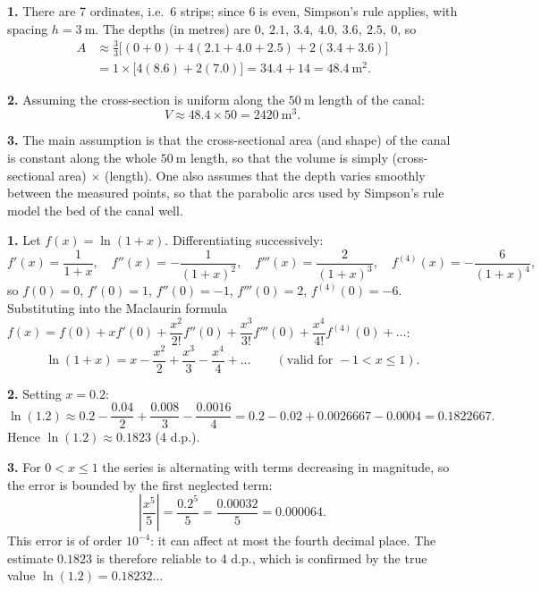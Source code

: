 \documentclass[11pt]{article}
\begin{document}
\begin{corrige}
\textbf{1.} There are 7 ordinates, i.e.\ 6 strips; since 6 is even, Simpson's rule applies, with spacing $h = 3\ \mathrm{m}$. The depths (in metres) are $0,\ 2.1,\ 3.4,\ 4.0,\ 3.6,\ 2.5,\ 0$, so
\begin{align*}
A &\approx \frac{3}{3}\Big[(0 + 0) + 4(2.1 + 4.0 + 2.5) + 2(3.4 + 3.6)\Big] \\
&= 1\times\big[4(8.6) + 2(7.0)\big] = 34.4 + 14 = 48.4\ \mathrm{m^2}.
\end{align*}

\textbf{2.} Assuming the cross-section is uniform along the $50\ \mathrm{m}$ length of the canal:
\[ V \approx 48.4 \times 50 = 2420\ \mathrm{m^3}. \]

\textbf{3.} The main assumption is that the cross-sectional area (and shape) of the canal is constant along the whole $50\ \mathrm{m}$ length, so that the volume is simply (cross-sectional area) $\times$ (length). One also assumes that the depth varies smoothly between the measured points, so that the parabolic arcs used by Simpson's rule model the bed of the canal well.
\end{corrige}

\begin{corrige}
\textbf{1.} Let $f(x) = \ln(1+x)$. Differentiating successively:
\[ f'(x) = \frac{1}{1+x},\quad f''(x) = -\frac{1}{(1+x)^2},\quad f'''(x) = \frac{2}{(1+x)^3},\quad f^{(4)}(x) = -\frac{6}{(1+x)^4}, \]
so $f(0)=0$, $f'(0)=1$, $f''(0)=-1$, $f'''(0)=2$, $f^{(4)}(0)=-6$. Substituting into the Maclaurin formula $f(x) = f(0) + xf'(0) + \dfrac{x^2}{2!}f''(0) + \dfrac{x^3}{3!}f'''(0) + \dfrac{x^4}{4!}f^{(4)}(0) + \dots$:
\[ \ln(1+x) = x - \frac{x^2}{2} + \frac{x^3}{3} - \frac{x^4}{4} + \dots \qquad (\text{valid for } -1 < x \le 1). \]

\textbf{2.} Setting $x = 0.2$:
\[ \ln(1.2) \approx 0.2 - \frac{0.04}{2} + \frac{0.008}{3} - \frac{0.0016}{4} = 0.2 - 0.02 + 0.0026667 - 0.0004 = 0.1822667. \]
Hence $\ln(1.2) \approx 0.1823$ (4 d.p.).

\textbf{3.} For $0 < x \le 1$ the series is alternating with terms decreasing in magnitude, so the error is bounded by the first neglected term:
\[ \left|\frac{x^5}{5}\right| = \frac{0.2^5}{5} = \frac{0.00032}{5} = 0.000064. \]
This error is of order $10^{-4}$: it can affect at most the fourth decimal place. The estimate $0.1823$ is therefore reliable to 4 d.p., which is confirmed by the true value $\ln(1.2) = 0.18232\dots$
\end{corrige}
\end{document}
